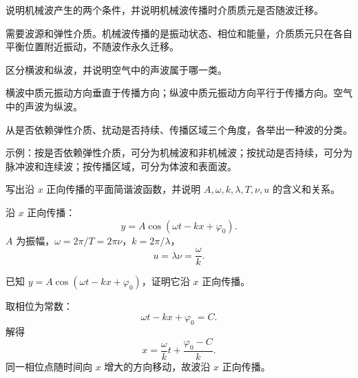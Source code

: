 %
%

\begin{exercise}[level=basic]
说明机械波产生的两个条件，并说明机械波传播时介质质元是否随波迁移。
\begin{solution}
需要波源和弹性介质。机械波传播的是振动状态、相位和能量，介质质元只在各自平衡位置附近振动，不随波作永久迁移。
\end{solution}
\end{exercise}

\begin{exercise}[level=basic]
区分横波和纵波，并说明空气中的声波属于哪一类。
\begin{solution}
横波中质元振动方向垂直于传播方向；纵波中质元振动方向平行于传播方向。空气中的声波为纵波。
\end{solution}
\end{exercise}

\begin{exercise}[level=basic]
从是否依赖弹性介质、扰动是否持续、传播区域三个角度，各举出一种波的分类。
\begin{solution}
示例：按是否依赖弹性介质，可分为机械波和非机械波；按扰动是否持续，可分为脉冲波和连续波；按传播区域，可分为体波和表面波。
\end{solution}
\end{exercise}

\begin{exercise}[level=basic]
写出沿 $x$ 正向传播的平面简谐波函数，并说明 $A,\omega,k,\lambda,T,\nu,u$ 的含义和关系。
\begin{solution}
沿 $x$ 正向传播：
\[
  y=A\cos(\omega t-kx+\varphi_0).
\]
$A$ 为振幅，$\omega=2\pi/T=2\pi\nu$，$k=2\pi/\lambda$，
\[
  u=\lambda\nu=\frac{\omega}{k}.
\]
\end{solution}
\end{exercise}

\begin{exercise}[level=basic]
已知 $y=A\cos(\omega t-kx+\varphi_0)$，证明它沿 $x$ 正向传播。
\begin{solution}
取相位为常数：
\[
  \omega t-kx+\varphi_0=C.
\]
解得
\[
  x=\frac{\omega}{k}t+\frac{\varphi_0-C}{k}.
\]
同一相位点随时间向 $x$ 增大的方向移动，故波沿 $x$ 正向传播。
\end{solution}
\end{exercise}

